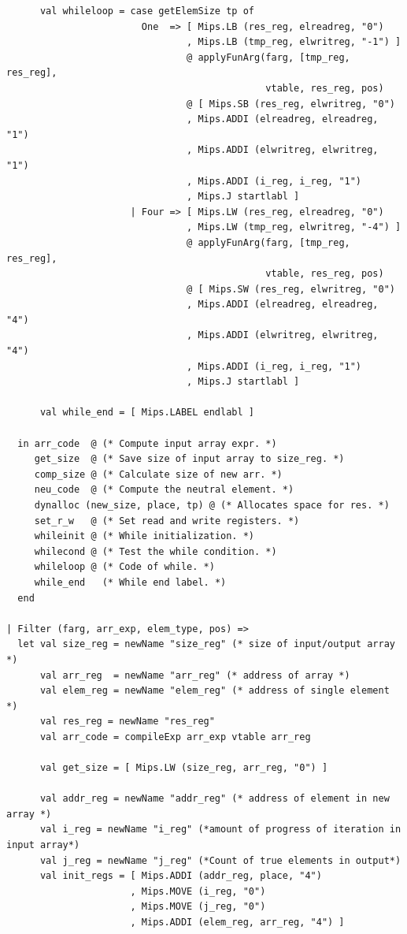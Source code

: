 \documentclass[11pt]{article}
\begin{document}
\begin{lstlisting}
      val whileloop = case getElemSize tp of
                        One  => [ Mips.LB (res_reg, elreadreg, "0")
                                , Mips.LB (tmp_reg, elwritreg, "-1") ]
                                @ applyFunArg(farg, [tmp_reg, res_reg],
                                              vtable, res_reg, pos)
                                @ [ Mips.SB (res_reg, elwritreg, "0")
                                , Mips.ADDI (elreadreg, elreadreg, "1")
                                , Mips.ADDI (elwritreg, elwritreg, "1")
                                , Mips.ADDI (i_reg, i_reg, "1")
                                , Mips.J startlabl ]
                      | Four => [ Mips.LW (res_reg, elreadreg, "0")
                                , Mips.LW (tmp_reg, elwritreg, "-4") ]
                                @ applyFunArg(farg, [tmp_reg, res_reg],
                                              vtable, res_reg, pos)
                                @ [ Mips.SW (res_reg, elwritreg, "0")
                                , Mips.ADDI (elreadreg, elreadreg, "4")
                                , Mips.ADDI (elwritreg, elwritreg, "4")
                                , Mips.ADDI (i_reg, i_reg, "1")
                                , Mips.J startlabl ]

      val while_end = [ Mips.LABEL endlabl ]

  in arr_code  @ (* Compute input array expr. *)
     get_size  @ (* Save size of input array to size_reg. *)
     comp_size @ (* Calculate size of new arr. *)
     neu_code  @ (* Compute the neutral element. *)
     dynalloc (new_size, place, tp) @ (* Allocates space for res. *)
     set_r_w   @ (* Set read and write registers. *)
     whileinit @ (* While initialization. *)
     whilecond @ (* Test the while condition. *)
     whileloop @ (* Code of while. *)
     while_end   (* While end label. *)
  end

| Filter (farg, arr_exp, elem_type, pos) =>
  let val size_reg = newName "size_reg" (* size of input/output array *)
      val arr_reg  = newName "arr_reg" (* address of array *)
      val elem_reg = newName "elem_reg" (* address of single element *)
      val res_reg = newName "res_reg"
      val arr_code = compileExp arr_exp vtable arr_reg

      val get_size = [ Mips.LW (size_reg, arr_reg, "0") ]

      val addr_reg = newName "addr_reg" (* address of element in new array *)
      val i_reg = newName "i_reg" (*amount of progress of iteration in input array*)
      val j_reg = newName "j_reg" (*Count of true elements in output*)
      val init_regs = [ Mips.ADDI (addr_reg, place, "4")
                      , Mips.MOVE (i_reg, "0")
                      , Mips.MOVE (j_reg, "0")
                      , Mips.ADDI (elem_reg, arr_reg, "4") ]


\end{lstlisting}
\end{document}
